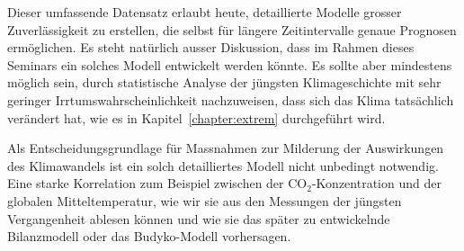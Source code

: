 Dieser umfassende Datensatz erlaubt heute, detaillierte Modelle
grosser Zuverlässigkeit zu erstellen, die selbst für längere Zeitintervalle
genaue Prognosen ermöglichen.
Es steht natürlich ausser Diskussion, dass im Rahmen dieses Seminars
ein solches Modell entwickelt werden könnte.
Es sollte aber mindestens möglich sein, durch statistische Analyse der
jüngsten Klimageschichte mit sehr geringer Irrtumswahrscheinlichkeit
nachzuweisen, dass sich das Klima tatsächlich verändert hat, wie es
in Kapitel~\ref{chapter:extrem} durchgeführt wird.

Als Entscheidungsgrundlage für Massnahmen zur Milderung der Auswirkungen
des Klimawandels ist ein solch detailliertes Modell nicht unbedingt notwendig.
Eine starke Korrelation zum Beispiel zwischen der $\text{CO}_2$-Konzentration
und der globalen Mitteltemperatur, wie wir sie aus den Messungen der
jüngsten Vergangenheit ablesen können und wie sie das später zu entwickelnde
Bilanzmodell oder das Budyko-Modell vorhersagen.







